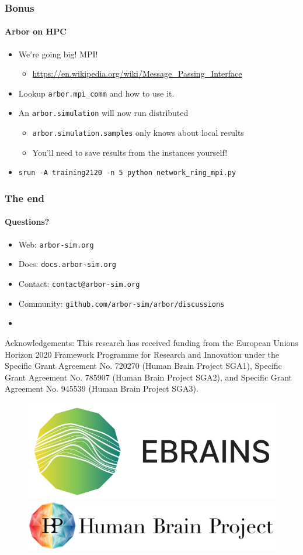 \documentclass[t]{beamer}
\begin{document}
\begin{frame}
    \frametitle{Bonus}
    \framesubtitle{Arbor on HPC}
    \begin{itemize}
        \item We’re going big! MPI!
        \begin{itemize}
            \item \url{https://en.wikipedia.org/wiki/Message\_Passing\_Interface}
        \end{itemize}
        \item Lookup \texttt{arbor.mpi\_comm} and how to use it.
        \item An \texttt{arbor.simulation} will now run distributed
        \begin{itemize}
            \item \texttt{arbor.simulation.samples} only knows about local results
            \item You’ll need to save results from the instances yourself!
        \end{itemize}
        \item \texttt{srun -A training2120 -n 5 python network\_ring\_mpi.py}
    \end{itemize}
\end{frame}


\begin{frame}
    \frametitle{The end}
    \framesubtitle{Questions?}
    \begin{itemize}
        \item Web: \texttt{arbor-sim.org}
        \item Docs: \texttt{docs.arbor-sim.org}
        \item Contact: \texttt{contact@arbor-sim.org}
        \item Community: \texttt{github.com/arbor-sim/arbor/discussions}
        \item[]
    \end{itemize}

    { \scriptsize Acknowledgements: This research has received funding from the European Unions
    Horizon 2020 Framework Programme for Research and
    Innovation under the Specific Grant Agreement No. 720270
    (Human Brain Project SGA1), Specific Grant Agreement No.
    785907 (Human Brain Project SGA2), and Specific Grant
    Agreement No. 945539 (Human Brain Project SGA3). }
    \newline
    \begin{figure}[h]
        \begin{center}
            \includegraphics[width=0.2\linewidth]{ebrains_logo.png}
            \hspace{2em}
            \includegraphics[width=0.4\linewidth]{HBP_logo.jpg}
        \end{center}
    \end{figure}
\end{frame}
\end{document}
